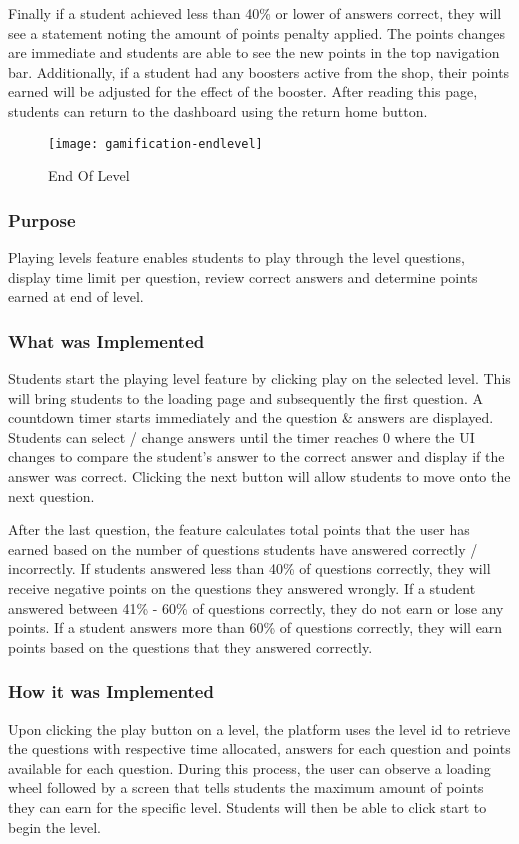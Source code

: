 \newpage

Finally if a student achieved less than 40\% or lower of answers correct, they will see a statement noting the amount of points penalty applied. The points changes are immediate and students are able to see the new points in the top navigation bar. Additionally, if a student had any boosters active from the shop, their points earned will be adjusted for the effect of the booster. After reading this page, students can return to the dashboard using the return home button.

\begin{figure}[h!]
    \texttt{[image: gamification-endlevel]}
    \centering
    \caption{End Of Level}
\end{figure}

\newpage

\subsubsection{Purpose}
Playing levels feature enables students to play through the level questions, display time limit per question, review correct answers and determine points earned at end of level.

\subsubsection{What was Implemented}
Students start the playing level feature by clicking play on the selected level. This will bring students to the loading page and subsequently the first question. A countdown timer starts immediately and the question \& answers are displayed. Students can select / change answers until the timer reaches 0 where the UI changes to compare the student's answer to the correct answer and display if the answer was correct. Clicking the next button will allow students to move onto the next question.

After the last question, the feature calculates total points that the user has earned based on the number of questions students have answered correctly / incorrectly. If students answered less than 40\% of questions correctly, they will receive negative points on the questions they answered wrongly. If a student answered between 41\% - 60\% of questions correctly, they do not earn or lose any points. If a student answers more than 60\% of questions correctly, they will earn points based on the questions that they answered correctly.


\subsubsection{How it was Implemented}
Upon clicking the play button on a level, the platform uses the level id to retrieve the questions with respective time allocated, answers for each question and points available for each question. During this process, the user can observe a loading wheel followed by a screen that tells students the maximum amount of points they can earn for the specific level. Students will then be able to click start to begin the level.

